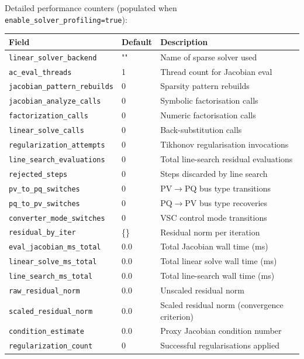 Detailed performance counters (populated when \texttt{enable\_solver\_profiling=true}):
\begin{longtable}{lll}
\hline\hline
\textbf{Field} & \textbf{Default} & \textbf{Description} \\
\hline\endhead\hline\endfoot
\texttt{linear\_solver\_backend} & "" & Name of sparse solver used \\
\texttt{ac\_eval\_threads} & 1 & Thread count for Jacobian eval \\
\texttt{jacobian\_pattern\_rebuilds} & 0 & Sparsity pattern rebuilds \\
\texttt{jacobian\_analyze\_calls} & 0 & Symbolic factorisation calls \\
\texttt{factorization\_calls} & 0 & Numeric factorisation calls \\
\texttt{linear\_solve\_calls} & 0 & Back-substitution calls \\
\texttt{regularization\_attempts} & 0 & Tikhonov regularisation invocations \\
\texttt{line\_search\_evaluations} & 0 & Total line-search residual evaluations \\
\texttt{rejected\_steps} & 0 & Steps discarded by line search \\
\texttt{pv\_to\_pq\_switches} & 0 & PV$\to$PQ bus type transitions \\
\texttt{pq\_to\_pv\_switches} & 0 & PQ$\to$PV bus type recoveries \\
\texttt{converter\_mode\_switches} & 0 & VSC control mode transitions \\
\texttt{residual\_by\_iter} & \{\} & Residual norm per iteration \\
\texttt{eval\_jacobian\_ms\_total} & 0.0 & Total Jacobian wall time (ms) \\
\texttt{linear\_solve\_ms\_total} & 0.0 & Total linear solve wall time (ms) \\
\texttt{line\_search\_ms\_total} & 0.0 & Total line-search wall time (ms) \\
\texttt{raw\_residual\_norm} & 0.0 & Unscaled residual norm \\
\texttt{scaled\_residual\_norm} & 0.0 & Scaled residual norm (convergence criterion) \\
\texttt{condition\_estimate} & 0.0 & Proxy Jacobian condition number \\
\texttt{regularization\_count} & 0 & Successful regularisations applied \\
\end{longtable}

